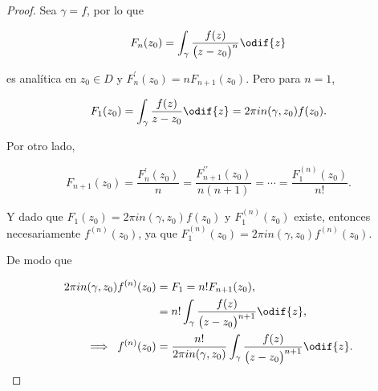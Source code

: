 \documentclass[../main.tex]{subfiles}
\begin{document}
\begin{proof}
    Sea \(\gamma = f\), por lo que

    \begin{equation*}
        F_{n}(z_{0}) = \int_{\gamma}^{}\dfrac{f(z)}{\bigl(z - z_{0}\bigr)^{n}}\odif{z}
    \end{equation*}

    es analítica en \(z_{0}\in D\) y \(F_{n}^{\prime}(z_{0}) = n F_{n +
    1}(z_{0})\). Pero
    para \(n = 1\),

    \begin{equation*}
        F_{1}(z_{0}) = \int_{\gamma}^{}\dfrac{f(z)}{z - z_{0}}\odif{z} = 2\pi in(\gamma,
        z_{0})f(z_{0}).
    \end{equation*}

    Por otro lado,

    \begin{equation*}
        F_{n + 1}(z_{0}) = \dfrac{F_{n}^{\prime}(z_{0})}{n} = \dfrac{F_{n +
        1}^{\prime\prime}(z_{0})}{n(n + 1)} = \cdots = \dfrac{F_{1}^{(n)}(z_{0})}{n!}.
    \end{equation*}

    Y dado que \(F_{1}(z_{0}) = 2\pi in(\gamma, z_{0})f(z_{0})\) y
    \(F_{1}^{(n)}(z_{0})\)
    existe, entonces necesariamente \(f^{(n)}(z_{0})\), ya que
    \(F_{1}^{(n)}(z_{0}) = 2\pi
    in(\gamma, z_{0})f^{(n)}(z_{0})\).

    De modo que

    \begin{align*}
        2\pi in(\gamma, z_{0})f^{(n)}(z_{0}) &= F_{1} = n! F_{n + 1}(z_{0}),\\
        &= n! \int_{\gamma}^{}\dfrac{f(z)}{\bigl(z - z_{0}\bigr)^{n + 1}}\odif{z},\\
        \implies\; f^{(n)}(z_{0}) &= \dfrac{n!}{2\pi in(\gamma,
        z_{0})}\int_{\gamma}^{}\dfrac{f(z)}{\bigl(z - z_{0}\bigr)^{n + 1}}\odif{z}.
    \end{align*}
\end{proof}
\end{document}
